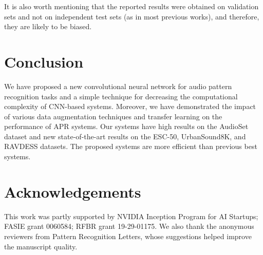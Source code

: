 \documentclass{article}
\begin{document}
\begin{sloppy}
It is also worth mentioning that the reported results were obtained on validation sets and not on independent test sets (as in most previous works), and therefore, they are likely to be biased.



\section{Conclusion}
\label{section5}
We have proposed a new convolutional neural network for audio pattern recognition tasks and a simple technique for decreasing the computational complexity of CNN-based systems. Moreover, we have demonstrated the impact of various data augmentation techniques and transfer learning on the performance of APR systems. Our systems have high results on the AudioSet dataset and new state-of-the-art results on the \mbox{ESC-50}, UrbanSound8K, and RAVDESS datasets. The proposed systems are more efficient than previous best systems.


\section{Acknowledgements}
This work was partly supported by NVIDIA Inception Program for AI Startups; FASIE grant 0060584; RFBR grant 19-29-01175. We also thank the anonymous reviewers from Pattern Recognition Letters, whose suggestions helped improve the manuscript quality.






\end{sloppy}
\end{document}
